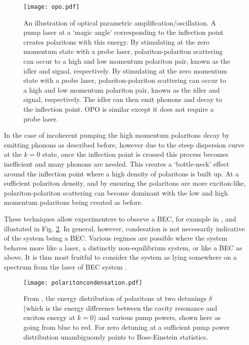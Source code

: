 \documentclass[letterpaper, 10 pt, conference]{IEEEtran}  %
\newcommand{\fig}[1]{Fig. #1}
\begin{document}
\begin{figure}[htbp!]
	\centering
	\texttt{[image: opo.pdf]}
	\caption{An illustration of optical parametric amplification/oscillation. A pump laser at a `magic angle' corresponding to the inflection point creates polaritons with this energy. 
	By stimulating at the zero momentum state with a probe laser, polariton-polariton scattering can occur to a high and low momentum polariton pair, known as the idler and signal, respectively. 
By stimulating at the zero momentum state with a probe laser, polariton-polariton scattering can occur to a high and low momentum polariton pair, known as the idler and signal, respectively.
The idler can then emit phonons and decay to the inflection point.
	OPO is similar except it does not require a probe laser. \cite{doi:10.1080/00107514.2010.550120}}
	\label{fig:opo}
\end{figure}
In the case of incoherent pumping the high momentum polaritons decay by emitting phonons as described before, however due to the steep dispersion curve at the $k=0$ state, once the inflection point is crossed this process becomes inefficient and many phonons are needed. 
This creates a `bottle-neck' effect around the inflection point where a high density of polaritons is built up. 
At a sufficient polariton density, and by ensuring the polaritons are more exciton-like, polariton-polariton scattering can become dominant with the low and high momentum polaritons being created as before. 

These techniques allow experimenters to observe a BEC, for example in \cite{PhysRevLett.118.016602}, and illustated in \fig{\ref{fig:polariton-condesation}}. 
In general, however, condesation is not necessarily indicative of the system being a BEC. 
Various regimes are possible where the system behaves more like a laser, a distinctly non-equilibrium system, or like a BEC as above.
It is thus most fruitful to consider the system as lying somewhere on a spectrum from the laser of BEC system \cite{Byrnes2014}. 
\begin{figure}[htbp!]
	\centering
	\texttt{[image: polaritoncondensation.pdf]}
	\caption{From \cite{PhysRevLett.118.016602}, the energy distribution of polaritons at two detunings $\delta$ (which is the energy difference between the cavity resonance and exciton energy at $k=0$) and various pump powers, shown here as going from blue to red. For zero detuning at a sufficient pump power distribution unambiguously points to Bose-Einstein statistics.}
	\label{fig:polariton-condesation}
\end{figure}
\end{document}
